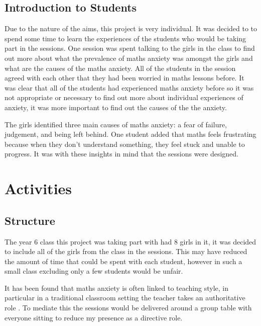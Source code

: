 \documentclass[11pt, a4paper, notitlepage]{article}
\begin{document}
\subsection{Introduction to Students}
Due to the nature of the aims, this project is very individual. It was decided to to spend some time to learn the experiences of the students who would be taking part in the sessions. One session was spent talking to the girls in the class to find out more about what the prevalence of maths anxiety was amongst the girls and what are the causes of the maths anxiety. All of the students in the session agreed with each other that they had been worried in maths lessons before. It was clear that all of the students had experienced maths anxiety before so it was not appropriate or necessary to find out more about individual experiences of anxiety, it was more important to find out the causes of the the anxiety.
\par
The girls identified three main causes of maths anxiety: a fear of failure, judgement, and being left behind. One student added that maths feels frustrating because when they don't understand something, they feel stuck and unable to progress. It was with these insights in mind that the sessions were designed.

\section{Activities}
\subsection{Structure}
The year 6 class this project was taking part with had 8 girls in it, it was decided to include all of the girls from the class in the sessions. This may have reduced the amount of time that could be spent with each student, however in such a small class excluding only a few students would be unfair. 
\par It has been found that maths anxiety is often linked to teaching style, in particular in a traditional classroom setting the teacher takes an authoritative role \cite{Finlayson:2014}. To mediate this the sessions would be delivered around a group table with everyone sitting to reduce my presence as a directive role. 
\end{document}
